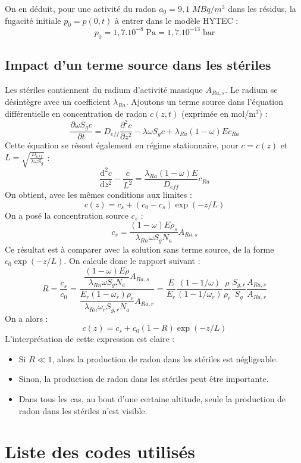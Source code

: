 \documentclass{article}
\begin{document}
On en déduit, pour une activité du radon $a_0=9,1 \; MBq/m^3$ dans les résidus, la fugacité initiale $p_0=p(0,t)$ à entrer dans le modèle HYTEC :
$$
p_0=1,7 .10^{-8} \; \text{Pa}=1,7 .10^{-13} \; \text{bar}
$$

\subsection{Impact d'un terme source dans les stériles}
\label{annexe:termesource}

Les stériles contiennent du radium d’activité massique $A_{Ra,s}$. Le radium se désintègre avec un coefficient $\lambda_{Ra}$. Ajoutons un terme source dans l’équation différentielle en concentration de radon $c(z,t)$ (exprimée en mol/m$^3$) :
$$
\frac{\partial \omega S_g c}{\partial t} = D_{eff}  \frac{\partial^2 c}{\partial z^2}-\lambda \omega S_g c + \lambda_{Ra}(1-\omega)E c_{Ra}
$$
Cette équation se résout également en régime stationnaire, pour $c=c(z)$ et $L=\sqrt{\frac{D_{eff}}{\lambda \omega S_g }}$ :
$$
\frac{\text{d}^2 c}{\text{d}z^2} - \frac{c}{L^2}= \frac{\lambda_{Ra}(1-\omega)E}{D_{eff}} c_{Ra}
$$
On obtient, avec les mêmes conditions aux limites :
$$
c(z)= c_s + (c_0 - c_s) \exp(-z/L)
$$
On a posé la concentration source $c_s$ :
$$
c_s = \frac{(1-\omega)E\rho_s}{\lambda_{Rn}\omega S_g N_a} A_{Ra,s} 
$$
Ce résultat est à comparer avec la solution sans terme source, de la forme $c_0 \exp(-z/L)$. On calcule donc le rapport suivant :
$$
R=\dfrac{c_s}{c_0}= \dfrac{\dfrac{(1-\omega)E\rho}{\lambda_{Rn}\omega S_g N_a} A_{Ra,s}}{\dfrac{ E_r (1-\omega_r) \rho_r }{\lambda_{Rn} \omega_r S_{g,r} N_a} A_{Ra,r}} = \frac{E}{E_r} \frac{(1-1/\omega)}{(1-1/\omega_r)} \frac{\rho}{\rho_r} \frac{S_{g,r}}{S_g} \frac{A_{Ra,s}}{A_{Ra,r}}
$$
On a alors :
$$
c(z)=c_s + c_0(1-R) \exp(-z/L)
$$
L'interprétation de cette expression est claire :
\begin{itemize}
  \item Si $R\ll 1$, alors la production de radon dans les stériles est négligeable.
  \item Sinon, la production de radon dans les stériles peut être importante.
  \item Dans tous les cas, au bout d'une certaine altitude, seule la production de radon dans les stériles n'est visible.
\end{itemize}

\renewcommand\lstlistingname{Code n°}
\renewcommand\lstlistlistingname{}
\newpage
\section{Liste des codes utilisés}
\lstlistoflistings
\newpage
\end{document}
